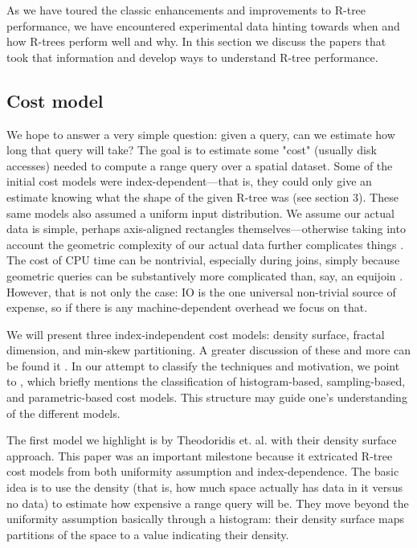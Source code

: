 As we have toured the classic enhancements and improvements to R-tree performance, we have encountered experimental data hinting towards when and how R-trees perform well and why.
In this section we discuss the papers that took that information and develop ways to understand R-tree performance.

\subsection{Cost model}
We hope to answer a very simple question: given a query, can we estimate how long that query will take?
The goal is to estimate some "cost" (usually disk accesses) needed to compute a range query over a spatial dataset.
Some of the initial cost models were index-dependent---that is, they could only give an estimate knowing what the shape of the given R-tree was \cite{theodoridisstefanakissellis00} (see section 3).
These same models also assumed a uniform input distribution.
We assume our actual data is simple, perhaps axis-aligned rectangles themselves---otherwise taking into account the geometric complexity of our actual data further complicates things \cite{aboulnaganaughton00}.
The cost of CPU time can be nontrivial, especially during joins, simply because geometric queries can be substantively more complicated than, say, an equijoin \cite{theodoridisstefanakissellis00}.
However, that is not only the case: IO is the one universal non-trivial source of expense, so if there is any machine-dependent overhead we focus on that.

We will present three index-independent cost models: density surface, fractal dimension, and min-skew partitioning.
A greater discussion of these and more can be found it \cite{thebook}.
In our attempt to classify the techniques and motivation, we point to \cite{acharyapoosalaramaswamy99}, which briefly mentions the classification of histogram-based, sampling-based, and parametric-based cost models. This structure may guide one's understanding of the different models.

The first model we highlight is by Theodoridis et. al. \cite{theodoridissellis96,theodoridisstefanakissellis00} with their density surface approach.
This paper was an important milestone because it extricated R-tree cost models from both uniformity assumption and index-dependence.
The basic idea is to use the density (that is, how much space actually has data in it versus no data) to estimate how expensive a range query will be.
They move beyond the uniformity assumption basically through a histogram: their density surface maps partitions of the space to a value indicating their density.

